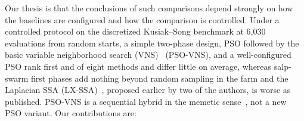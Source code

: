 Our thesis is that the conclusions of such comparisons depend strongly on how the baselines are configured and how the comparison is controlled. Under a controlled protocol on the discretized Kusiak--Song benchmark at 6,030 evaluations from random starts, a simple two-phase design, PSO followed by the basic variable neighborhood search (VNS)~\cite{Mladenovic1997,Hansen2001} (PSO-VNS), and a well-configured PSO rank first and \NPSOPos{} of eight methods and differ little on average, whereas salp-swarm first phases add nothing beyond random sampling in the farm and the Laplacian SSA (LX-SSA)~\cite{Solanki2023}, proposed earlier by two of the authors, is worse as published. PSO-VNS is a sequential hybrid in the memetic sense~\cite{Neri2012}, not a new PSO variant.
Our contributions are:
